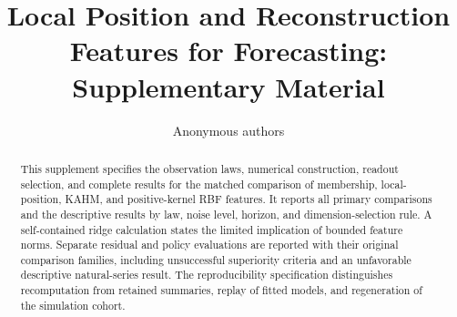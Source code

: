 \documentclass[10pt]{article}
\title{Local Position and Reconstruction Features for Forecasting:\\Supplementary Material}
\author{Anonymous authors}
\begin{document}
\maketitle
\begin{abstract}
This supplement specifies the observation laws, numerical construction, readout selection, and complete results for the matched comparison of membership, local-position, KAHM, and positive-kernel RBF features. It reports all primary comparisons and the descriptive results by law, noise level, horizon, and dimension-selection rule. A self-contained ridge calculation states the limited implication of bounded feature norms. Separate residual and policy evaluations are reported with their original comparison families, including unsuccessful superiority criteria and an unfavorable descriptive natural-series result. The reproducibility specification distinguishes recomputation from retained summaries, replay of fitted models, and regeneration of the simulation cohort.
\end{abstract}







\end{document}
